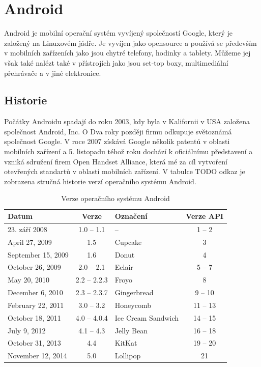 
\section{Android}
Android je mobilní operační systém vyvíjený společností Google, který je založený na Linuxovém jádře. Je vyvíjen jako opensource a používá se především v mobilních zařízeních jako jsou chytré telefony, hodinky a tablety. Můžeme jej však také nalézt také v přístrojích jako jsou set-top boxy, multimediální přehrávače a v jiné elektronice.\\
\subsection{Historie}
Počátky Androidu spadají do roku 2003, kdy byla v Kalifornii v USA založena společnost Android, Inc. O Dva roky později firmu odkupuje světoznámá společnost Google. V roce 2007 získává Google několik patentů v oblasti mobilních zařízení a 5. listopadu téhož roku dochází k oficiálnímu představení a vzniká sdružení firem Open Handset Alliance, která mé za cíl vytvoření otevřených standartů v oblasti mobilních zařízení. V tabulce TODO odkaz je zobrazena stručná historie verzí operačního systému Android.

\begin {table}[h!]
\begin{tabular}{|l|c|l|c|}
\hline
{\bf Datum}         & {\bf Verze}   & {\bf Označení}        & {\bf Verze API}   \\
\hline \hline
23. září 2008       & 1.0 -- 1.1    & --                    & 1 -- 2            \\
\hline
April 27, 2009      & 1.5           & Cupcake               & 3                 \\
\hline
September 15, 2009  & 1.6           & Donut                 & 4                 \\
\hline
October 26, 2009    & 2.0 -- 2.1    & Eclair                & 5 -- 7            \\
\hline
May 20, 2010        & 2.2 -- 2.2.3  & Froyo                 & 8                 \\
\hline
December 6, 2010    & 2.3 -- 2.3.7  & Gingerbread           & 9 -- 10           \\
\hline
February 22, 2011   & 3.0 -- 3.2    & Honeycomb             & 11 -- 13          \\
\hline
October 18, 2011    & 4.0 -- 4.0.4  & Ice Cream Sandwich    & 14 -- 15          \\
\hline
July 9, 2012        & 4.1 -- 4.3    & Jelly Bean            & 16 -- 18          \\
\hline
October 31, 2013    & 4.4           & KitKat                & 19 -- 20          \\
\hline
November 12, 2014   & 5.0           & Lollipop              & 21                \\
\hline
\end{tabular}
\centering
\caption{Verze operačního systému Android}
\end{table}

